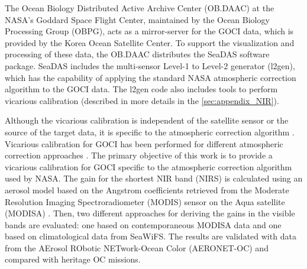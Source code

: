 \documentclass[]{interact}
\theoremstyle{plain}%
\theoremstyle{definition}
\theoremstyle{remark}
\providecommand{\DIFaddtex}[1]{{\protect\color{blue}\uwave{#1}}} %
\providecommand{\DIFaddbegin}{} %
\providecommand{\DIFaddend}{} %
\providecommand{\DIFadd}[1]{\texorpdfstring{\DIFaddtex{#1}}{#1}} %
\newcommand{\DIFaddincludegraphics}[2][]{{\color{blue}\fbox{\DIFOincludegraphics[#1]{#2}}}} %
\DeclareRobustCommand{\DIFaddbegin}{\DIFOaddbegin \let\includegraphics\DIFaddincludegraphics} %
\DeclareRobustCommand{\DIFaddend}{\DIFOaddend \let\includegraphics\DIFOincludegraphics} %
\begin{document}
The Ocean Biology Distributed Active Archive Center (OB.DAAC) at the NASA's Goddard Space Flight Center, maintained by the Ocean Biology Processing Group (OBPG), acts as a mirror-server for the GOCI data, which is provided by the Korea Ocean Satellite Center.  To support the visualization and processing of these data, the OB.DAAC distributes the SeaDAS software package.  SeaDAS includes the multi-sensor Level-1 to Level-2 generator (l2gen), which has the capability of applying the standard NASA atmospheric correction algorithm to the GOCI data. The l2gen code also includes tools to perform vicarious calibration (described in more details in the \autoref{sec:appendix_NIR}). 

Although the vicarious calibration \DIFaddbegin \DIFadd{method }\DIFaddend is independent of the satellite sensor or the source of the target data, it is specific to the atmospheric correction algorithm \citep{Franz:07}. Vicarious calibration for GOCI has been performed for different atmospheric correction approaches \citep{Ahn2015,Wang:13}. The primary objective of this work is to provide a vicarious calibration for GOCI specific to the atmospheric correction algorithm used by NASA. The gain for the shortest NIR band (NIRS) is calculated using an aerosol model based on the Angstrom coefficients retrieved from the Moderate Resolution Imaging Spectroradiometer (MODIS) sensor on the Aqua satellite (MODISA) \citep{Esaias1998}. Then, two different approaches for deriving the gains in the visible bands are evaluated: one based on contemporaneous MODISA data and one based on climatological data from SeaWiFS. The results are validated with data from the AErosol RObotic NETwork-Ocean Color (AERONET-OC) \citep{Zibordi2009} and compared with heritage OC missions. 

\end{document}
